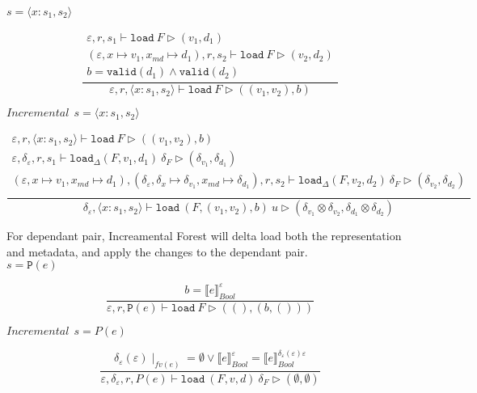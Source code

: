 \documentclass[10pt,twoside,a4paper]{article}
\theoremstyle{theorem}
\theoremstyle{lemma}
\theoremstyle{property}
\theoremstyle{definition}
\theoremstyle{assumption}
\begin{document}
$\boxed{s = \langle x : s_1, s_2 \rangle}$

\begin{displaymath}
	\frac{\begin{array}{c}
		\varepsilon, r, s_1 \vdash \mathtt{load}~F \rhd (v_1,d_1)\\
		(\varepsilon, x \mapsto v_1, x_{md} \mapsto d_1), r, s_2 \vdash \mathtt{load}~F \rhd (v_2,d_2)\\
		b = \mathtt{valid}(d_1) \land \mathtt{valid}(d_2)
	\end{array}}
	{\varepsilon, r, \langle x : s_1, s_2 \rangle \vdash \mathtt{load}~F \rhd ((v_1, v_2),b) }
\end{displaymath}

$\boxed{Incremental~~s = \langle x : s_1, s_2 \rangle}$

\begin{displaymath}
	\frac{\begin{array}{c}
		\varepsilon, r, \langle x : s_1, s_2 \rangle \vdash \mathtt{load}~F \rhd ((v_1, v_2),b)\\
		\varepsilon, \delta_\varepsilon, r, s_1 \vdash \mathtt{load}_\Delta (F,v_1,d_1)~ \delta_F \rhd (\delta_{v_1},\delta_{d_1})\\
		(\varepsilon, x \mapsto v_1, x_{md} \mapsto d_1), (\delta_\varepsilon, \delta_x \mapsto \delta_{v_1}, x_{md} \mapsto \delta_{d_1}), r, s_2 \vdash \mathtt{load}_\Delta (F,v_2,d_2)~ \delta_F \rhd (\delta_{v_2},\delta_{d_2})\\
	\end{array}}
	{\delta_\varepsilon, \langle x:s_1,s_2 \rangle \vdash \mathtt{load}~ (F,(v_1,v_2),b)~ u \rhd (\delta_{v_1} \otimes \delta_{v_2},\delta_{d_1} \otimes \delta_{d_2}) }
\end{displaymath}

For dependant pair, Increamental Forest will delta load both the representation and metadata, and apply the changes to the dependant pair.\\

$\boxed{s = \mathtt{P}(e)}$

\begin{displaymath}
	\frac
	{b = \llbracket e \rrbracket^{\varepsilon}_{Bool}}
	{\varepsilon, r, \mathtt{P}(e) \vdash \mathtt{load}~F \rhd ((),(b,()))}
\end{displaymath}

$\boxed{Incremental~~s = P(e)}$

\begin{displaymath}
	\frac{ \delta_\varepsilon(\varepsilon) \mid_{fv(e)} = \emptyset \lor \llbracket e \rrbracket^{\varepsilon}_{Bool} = \llbracket e \rrbracket^{\delta_\varepsilon(\varepsilon) \varepsilon}_{Bool}}
	{\varepsilon, \delta_\varepsilon, r, P(e) \vdash \mathtt{load}~ (F,v,d) ~\delta_F \rhd (\emptyset, \emptyset)}
\end{displaymath}
\end{document}
